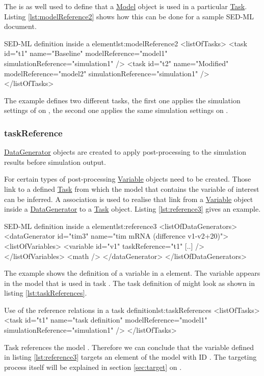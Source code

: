 The  is as well used to define that a \hyperref[class:model]{Model} object is used in a particular  \hyperref[class:task]{Task}. Listing \ref{lst:modelReference2} shows how this can be done for a sample SED-ML document.
%
\begin{myXmlLst}{SED-ML  definition inside a  element}{lst:modelReference2}
<listOfTasks>
 <task id="t1" name="Baseline" modelReference="model1" simulationReference="simulation1" />
 <task id="t2" name="Modified" modelReference="model2" simulationReference="simulation1" />
</listOfTasks>
\end{myXmlLst}
%
The example defines two different tasks, the first one applies the simulation settings of  on , the second one applies the same simulation settings on .

\subsubsection{taskReference}
\label{sec:taskReference}
\hyperref[class:dataGenerator]{DataGenerator} objects are created to apply post-processing to the simulation results before simulation output. 

For certain types of post-processing \hyperref[class:variable]{Variable} objects need to be created. Those link to a defined \hyperref[class:task]{Task} from which the model that contains the variable of interest can be inferred. 
A  association is used to realise that link from a \hyperref[class:variable]{Variable} object inside a \hyperref[class:dataGenerator]{DataGenerator} to a \hyperref[class:task]{Task} object. 
Listing \ref{lst:reference3} gives an example.
%
\begin{myXmlLst}{SED-ML  definition inside a  element}{lst:reference3}
<listOfDataGenerators>
 <dataGenerator id="tim3" name="tim mRNA (difference v1-v2+20)">
  <listOfVariables>
   <variable id="v1" taskReference="t1" [..] />
  </listOfVariables>
  <math />
 </dataGenerator>
</listOfDataGenerators>
\end{myXmlLst}
%
The example shows the definition of a variable  in a  element. The variable appears in the model that is used in task . The task definition of  might look as shown in listing \ref{lst:taskReferences}.
\begin{myXmlLst}{Use of the reference relations in a task definition}{lst:taskReferences}
<listOfTasks>
  <task id="t1" name="task definition" modelReference="model1" simulationReference="simulation1" />
</listOfTasks>
\end{myXmlLst}
Task  references the model . Therefore we can conclude that the variable  defined in listing \ref{lst:reference3} targets an element of the model with ID . The targeting process itself will be explained in section \ref{sec:target} on .

